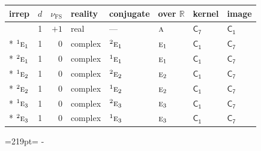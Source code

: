 \documentclass[10pt,a4paper]{article}
\newcommand{\needspace}[1]{\par\penalty-100\begingroup\dimen0=#1\relax\dimen2=\pagegoal
  \advance\dimen2-\pagetotal\ifdim\dimen0>\dimen2\relax\ifdim\dimen2>0pt\vfil\break\fi\fi
  \endgroup}
\numberwithin{equation}{section}
\newcommand{\grp}[1]{\mathsf{#1}}
\newcommand{\irr}[1]{\text{\normalfont\scshape #1}}
\newcommand{\conjpair}[1]{{}^{#1}}
\newcommand{\detbox}[1]{{\setlength{\fboxsep}{1pt}\fbox{#1}}}
\newcommand{\fsind}{\nu_{\mathrm{FS}}}
\begin{document}
{\small\renewcommand{\arraystretch}{1.25}\setlength{\tabcolsep}{4pt}\begin{longtable}{@{}lrrlllll@{}}\toprule
irrep & $d$ & $\fsind$ & reality & conjugate & over $\mathbb{R}$ & kernel & image\\\midrule\endhead
\bottomrule\endfoot\endlastfoot
\detbox{$\irr{a}$} & 1 & $+1$ & real & --- & $\irr{a}$ & \href{C7.pdf}{$\grp{C_{7}}$} & \href{../../../rotation/data/pdf/C1.pdf}{$\grp{C_{1}}$}\\*
$\conjpair{1}\irr{e}_{1}$ & 1 & $0$ & complex & $\conjpair{2}\irr{e}_{1}$ & $\irr{e}_{1}$ & \href{C1.pdf}{$\grp{C_{1}}$} & \href{../../../rotation/data/pdf/C7.pdf}{$\grp{C_{7}}$}\\*
$\conjpair{2}\irr{e}_{1}$ & 1 & $0$ & complex & $\conjpair{1}\irr{e}_{1}$ & $\irr{e}_{1}$ & \href{C1.pdf}{$\grp{C_{1}}$} & \href{../../../rotation/data/pdf/C7.pdf}{$\grp{C_{7}}$}\\*
$\conjpair{1}\irr{e}_{2}$ & 1 & $0$ & complex & $\conjpair{2}\irr{e}_{2}$ & $\irr{e}_{2}$ & \href{C1.pdf}{$\grp{C_{1}}$} & \href{../../../rotation/data/pdf/C7.pdf}{$\grp{C_{7}}$}\\*
$\conjpair{2}\irr{e}_{2}$ & 1 & $0$ & complex & $\conjpair{1}\irr{e}_{2}$ & $\irr{e}_{2}$ & \href{C1.pdf}{$\grp{C_{1}}$} & \href{../../../rotation/data/pdf/C7.pdf}{$\grp{C_{7}}$}\\*
$\conjpair{1}\irr{e}_{3}$ & 1 & $0$ & complex & $\conjpair{2}\irr{e}_{3}$ & $\irr{e}_{3}$ & \href{C1.pdf}{$\grp{C_{1}}$} & \href{../../../rotation/data/pdf/C7.pdf}{$\grp{C_{7}}$}\\*
$\conjpair{2}\irr{e}_{3}$ & 1 & $0$ & complex & $\conjpair{1}\irr{e}_{3}$ & $\irr{e}_{3}$ & \href{C1.pdf}{$\grp{C_{1}}$} & \href{../../../rotation/data/pdf/C7.pdf}{$\grp{C_{7}}$}\\
\bottomrule\end{longtable}}
\needspace{219pt}
\end{document}
